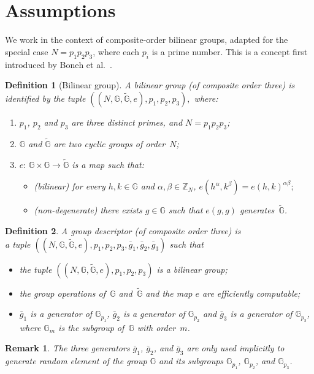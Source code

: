 \documentclass[a4paper,10pt]{article}
\newtheorem{definition}{Definition}
\newtheorem{remark}{Remark}
\newcommand{\G}{\mathbb{G}}
\newcommand{\GT}{\widetilde{\G}} \newcommand{\N}{\mathbb{N}}
\newcommand{\Z}{\mathbb{Z}}
\newcommand{\definline}[1]{(\textit{#1})}
\begin{document}
	\section{Assumptions}
	\label{assumptions.sec}
	We work in the context of composite-order bilinear groups, adapted for the special case $N=p_1p_2p_3$, where each $p_i$ is a prime number. This is a concept first introduced by Boneh et al.~\cite{kilian2005bilineargroups}.
	\begin{definition}[Bilinear group]
		\label{bilineargroup.def}
		A \emph{bilinear group} (of composite order three) is identified by the tuple
		$
			((N,\G,\GT,e),p_1,p_2,p_3),
		$
		 where:
		
		\begin{enumerate}
			\item
			$p_1$, $p_2$ and $p_3$ are three distinct primes, and $N=p_1 p_2 p_3$;
			\item
			$\G$ and $\widetilde{\G}$ are two cyclic groups of order~$N$;
			\item
			$e:\,\G\times\G\rightarrow\widetilde{\G}$ is a map such that:
			\begin{itemize}
				\item
				\definline{bilinear} for every $h,k\in\G$ and $\alpha,\beta\in\Z_N$, 
				$e(h^\alpha,k^\beta)=e(h,k)^{\alpha\beta}; $
				\item
				\definline{non-degenerate} there exists $g\in\G$ such that $e(g,g)$ generates~$\widetilde{\G}$.
			\end{itemize}
		\end{enumerate}
		\end{definition}
		\begin{definition}
		\label{groupdes.def}
		A \emph{group descriptor} (of composite order three) is\\ a tuple $((N,\G,\GT,e),p_1,p_2,p_3,\bar{g}_1,\bar{g}_2,\bar{g}_3)$ such that
		\begin{itemize}
		\item the tuple $((N,\G,\GT,e),p_1,p_2,p_3)$ is a bilinear group;
		\item the group operations of~$\G$ and~$\GT$ and the map $e$ are efficiently computable;
		\item $\bar{g}_1$ is a generator of $\G_{p_1}$, $\bar{g}_2$ is a generator of $\G_{p_2}$ and $\bar{g}_3$ is a generator of $\G_{p_3}$, where $\G_{m}$ is the subgroup of~$\G$ with order~$m$.
		\end{itemize}
		\end{definition}
		\begin{remark}
		The three generators $\bar{g}_1$, $\bar{g}_2$, and $\bar{g}_3$ are only used implicitly to generate random element of the group $\G$ and its subgroups $\G_{p_1}$, $\G_{p_2}$, and $\G_{p_3}$.
		\end{remark}
		
\end{document}
